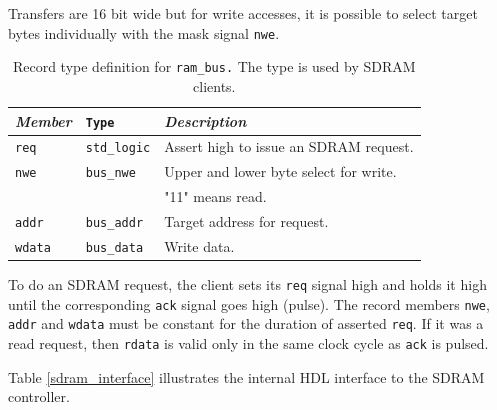 \documentclass[a4paper]{report}
\begin{document}
Transfers are 16 bit wide but for write accesses, it is
possible to select target bytes individually with the mask
signal \texttt{nwe}.

\begin{table}
\begin{tabular}{*3l}    \toprule
\emph{Member}   & \texttt{Type}         & \emph{Description} \\ \midrule
\texttt{req}    & \texttt{std\_logic}   & Assert high to issue an SDRAM request. \\
\texttt{nwe}    & \texttt{bus\_nwe}     & Upper and lower byte select for write.\\
                &                       & "11" means read. \\
\texttt{addr}   & \texttt{bus\_addr}    & Target address for request. \\
\texttt{wdata}  & \texttt{bus\_data}    & Write data. \\
\bottomrule
 \hline
\end{tabular}
\caption{Record type definition for \texttt{ram\_bus.} The type
is used by SDRAM clients.}
\label{ram_bus_type}
\end{table}

To do an SDRAM request, the client sets its \texttt{req} signal
high and holds it high until the corresponding \texttt{ack}
signal goes high (pulse). The record members \texttt{nwe},
\texttt{addr} and \texttt{wdata} must be constant for the
duration of asserted \texttt{req}.  If it was a read request,
then \texttt{rdata} is valid only in the same clock cycle as
\texttt{ack} is pulsed.

Table \ref{sdram_interface} illustrates the internal HDL
interface to the SDRAM controller.
\end{document}
